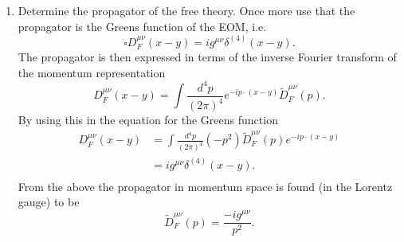 \begin{enumerate}
	\begin{equation}
		\braket{\text{phys'}|\partial_\mu A^\mu|\text{phys}}=0.
	\end{equation} 
	So, rather than requiring $\partial_\mu A^\mu=0$ in the Lagrangian density, the Lorentz gauge is imposed as an operator equation on physical states. To ensure the above, split $\partial_\mu A^\mu$ into its positive and negative energy parts
	\begin{equation}
		\partial_\mu A^\mu=(\partial_\mu A^\mu)^++(\partial_\mu A^\mu)^-,
	\end{equation} 
	where
	\begin{equation}
		(\partial_\mu A^\mu)^+=-i\int \frac{d^3p}{(2\pi)^3}\frac{1}{\sqrt{2E_{\vec{p}}}}\sum_{\lambda=0}^{\lambda}p_\mu\varepsilon^\mu(\vec{p},\lambda)a_{\vec{p},\lambda}e^{-ip\cdot x},
	\end{equation} 
	\begin{equation}
		(\partial_\mu A^\mu)^-=i\int \frac{d^3p}{(2\pi)^3}\frac{1}{\sqrt{2E_{\vec{p}}}}\sum_{\lambda=0}^{\lambda}p_\mu\varepsilon^{\mu*}(\vec{p},\lambda)a_{\vec{p},\lambda}^\dagger e^{ip\cdot x}.
	\end{equation} 
	From the definitions above it is clear that $(\partial_\mu A^\mu)^-=((\partial_\mu A^\mu)^+)^\dagger$. Therefore, $\braket{\dots|\partial_\mu A^\mu|\dots}$=0 is fulfilled if only
	\begin{equation}
		(\partial_\mu A^\mu)^+\ket{\text{phys}}=0.
	\end{equation} 
	This equation is taken to define the physical subspace of the Fock space. Hereby the EM field has been quantized.
	
	\item Determine the propagator of the free theory. Once more use that the propagator is the Greens function of the EOM,  i.e.
	\begin{equation}
		\square D_F^{\mu\nu}(x-y)=ig^{\mu\nu}\delta^{(4)}(x-y).
	\end{equation} 
	The propagator is then expressed in terms of the inverse Fourier transform of the momentum representation
	\begin{equation}
		D_F^{\mu\nu}(x-y)=\int \frac{d^4p}{(2\pi)^4}e^{-ip\cdot (x-y)}\tilde{D}_F^{\mu\nu}(p).
	\end{equation} 
	By using this in the equation for the Greens function
	\begin{equation}
		\begin{split}
			D_F^{\mu\nu}(x-y)&=\int \frac{d^4p}{(2\pi)^4}(-p^2)\tilde{D}_F^{\mu\nu}(p)e^{-ip\cdot (x-y)}\\
			&=ig^{\mu\nu}\delta^{(4)}(x-y).\\
		\end{split}
	\end{equation} 
	From the above the propagator in momentum space is found (in the Lorentz gauge) to be
	\begin{equation}
		\tilde{D}_F^{\mu\nu}(p)=\frac{-ig^{\mu\nu}}{p^2}.
	\end{equation} 
	
\end{enumerate}

